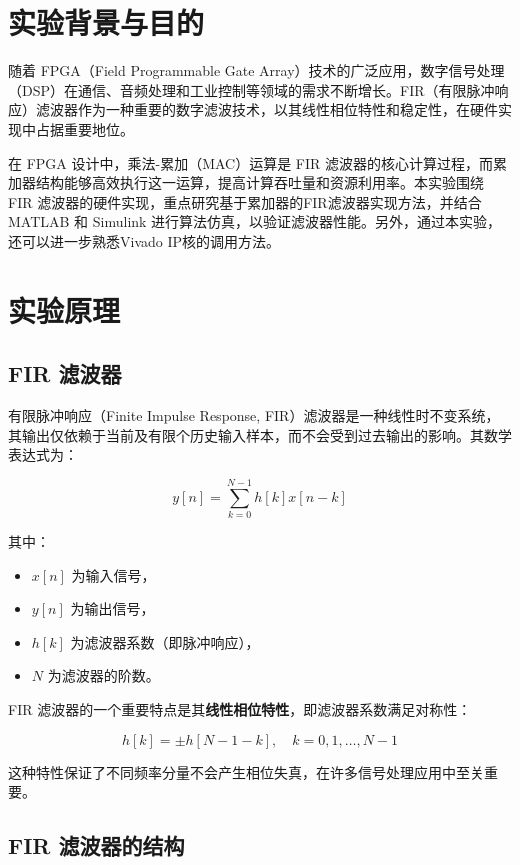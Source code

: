 \documentclass[lang=cn,newtx,10pt,scheme=chinese]{elegantbook}
\begin{document}
\section{实验背景与目的}
随着 FPGA（Field Programmable Gate Array）技术的广泛应用，数字信号处理（DSP）在通信、音频处理和工业控制等领域的需求不断增长。FIR（有限脉冲响应）滤波器作为一种重要的数字滤波技术，以其线性相位特性和稳定性，在硬件实现中占据重要地位。

在 FPGA 设计中，乘法-累加（MAC）运算是 FIR 滤波器的核心计算过程，而累加器结构能够高效执行这一运算，提高计算吞吐量和资源利用率。本实验围绕 FIR 滤波器的硬件实现，重点研究基于累加器的FIR滤波器实现方法，并结合 MATLAB 和 Simulink 进行算法仿真，以验证滤波器性能。另外，通过本实验，还可以进一步熟悉Vivado IP核的调用方法。

\section{实验原理}

\subsection{FIR 滤波器}

有限脉冲响应（Finite Impulse Response, FIR）滤波器是一种线性时不变系统，其输出仅依赖于当前及有限个历史输入样本，而不会受到过去输出的影响。其数学表达式为：

\begin{equation}
    y[n] = \sum_{k=0}^{N-1} h[k] x[n-k]
\end{equation}

其中：
\begin{itemize}
    \item $x[n]$ 为输入信号，
    \item $y[n]$ 为输出信号，
    \item $h[k]$ 为滤波器系数（即脉冲响应），
    \item $N$ 为滤波器的阶数。
\end{itemize}

FIR 滤波器的一个重要特点是其\textbf{线性相位特性}，即滤波器系数满足对称性：

\begin{equation}
    h[k] = \pm h[N-1-k], \quad k = 0,1,\dots, N-1
\end{equation}

这种特性保证了不同频率分量不会产生相位失真，在许多信号处理应用中至关重要。

\subsection{FIR 滤波器的结构}
\end{document}
